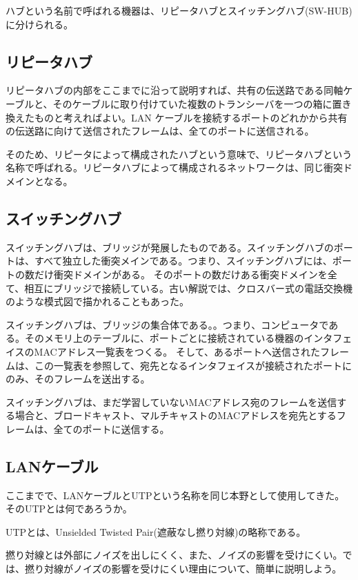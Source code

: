 ハブという名前で呼ばれる機器は、リピータハブとスイッチングハブ(SW-HUB)に分けられる。

\subsection{リピータハブ}

リピータハブの内部をここまでに沿って説明すれば、共有の伝送路である同軸ケーブルと、そのケーブルに取り付けていた複数のトランシーバを一つの箱に置き換えたものと考えればよい。LAN ケーブルを接続するポートのどれかから共有の伝送路に向けて送信されたフレームは、全てのポートに送信される。

そのため、リピータによって構成されたハブという意味で、リピータハブという名称で呼ばれる。リピータハブによって構成されるネットワークは、同じ衝突ドメインとなる。

\subsection{スイッチングハブ}

スイッチングハブは、ブリッジが発展したものである。スイッチングハブのポートは、すべて独立した衝突メインである。つまり、スイッチングハブには、ポートの数だけ衝突ドメインがある。
そのポートの数だけある衝突ドメインを全て、相互にブリッジで接続している。古い解説では、クロスバー式の電話交換機のような模式図で描かれることもあった。

スイッチングハブは、ブリッジの集合体である。。つまり、コンピュータである。そのメモリ上のテーブルに、ポートごとに接続されている機器のインタフェイスのMACアドレス一覧表をつくる。
そして、あるポートへ送信されたフレームは、この一覧表を参照して、宛先となるインタフェイスが接続されたポートにのみ、そのフレームを送出する。

スイッチングハブは、まだ学習していないMACアドレス宛のフレームを送信する場合と、ブロードキャスト、マルチキャストのMACアドレスを宛先とするフレームは、全てのポートに送信する。

\subsection{LANケーブル}

ここまでで、LANケーブルとUTPという名称を同じ本野として使用してきた。そのUTPとは何であろうか。

UTPとは、Unsielded Twisted Pair(遮蔽なし撚り対線)の略称である。

撚り対線とは外部にノイズを出しにくく、また、ノイズの影響を受けにくい。では、撚り対線がノイズの影響を受けにくい理由について、簡単に説明しよう。

